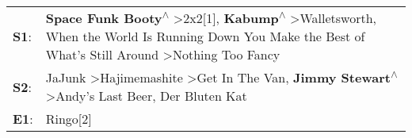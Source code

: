 \begin{supertabular}{p{0.03\textwidth}p{0.92\textwidth}}
 \textbf{S1}:  &  \textbf{Space Funk Booty\textsuperscript{$\wedge$}} \textgreater \enspace 2x2[1]\textsuperscript{}, \enspace \textbf{Kabump\textsuperscript{$\wedge$}} \textgreater \enspace Walletsworth\textsuperscript{}, \enspace When the World Is Running Down You Make the Best of What's Still Around\textsuperscript{} \textgreater \enspace Nothing Too Fancy\textsuperscript{}  \enspace  \\
 \textbf{S2}:  &                                                                       JaJunk\textsuperscript{} \textgreater \enspace Hajimemashite\textsuperscript{} \textgreater \enspace Get In The Van\textsuperscript{}, \enspace \textbf{Jimmy Stewart\textsuperscript{$\wedge$}} \textgreater \enspace Andy's Last Beer\textsuperscript{}, \enspace Der Bluten Kat\textsuperscript{}  \enspace  \\
 \textbf{E1}:  &                                                                                                                                                                                                                                                                                                                                                 Ringo[2]\textsuperscript{}  \enspace  \\
\end{supertabular}
